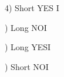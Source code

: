\documentclass{article}
\begin{document}
   4) Short YES I

) Long NOI                 

) Long YESI    
    
) Short NOI

\end{document}
